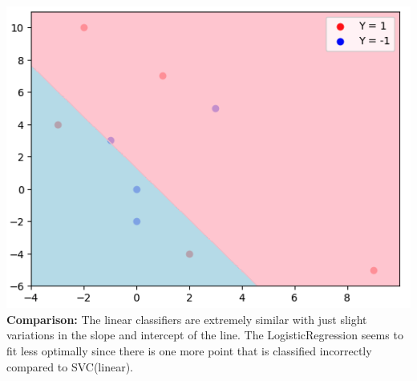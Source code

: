 \documentclass{assignment}
\begin{document}
\begin{problem}
\begin{enumerate}
\begin{enumerate}[label=(\alph*)]
        \includegraphics[scale=.4]{474-HW4-Q5-c.png}\\
        \color{blue}\textbf{Comparison:} The linear classifiers are extremely similar with just slight variations in the slope and intercept of the line. The LogisticRegression seems to fit less optimally since there is one more point that is classified incorrectly compared to SVC(linear). \color{black}


    \end{enumerate}
\end{enumerate}
\end{problem}
\end{document}
